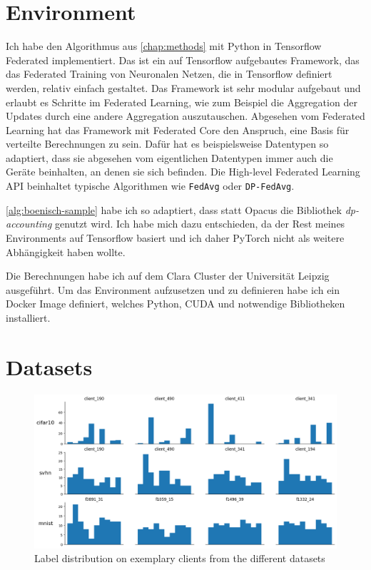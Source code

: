 \section{Environment}
Ich habe den Algorithmus aus \autoref{chap:methods} mit Python in Tensorflow Federated implementiert. Das ist ein auf Tensorflow aufgebautes Framework, das das Federated Training von Neuronalen Netzen, die in Tensorflow definiert werden, relativ einfach gestaltet. Das Framework ist sehr modular aufgebaut und erlaubt es Schritte im Federated Learning, wie zum Beispiel die Aggregation der Updates durch eine andere Aggregation auszutauschen. Abgesehen vom Federated Learning hat das Framework mit Federated Core den Anspruch, eine Basis für verteilte Berechnungen zu sein. Dafür hat es beispielsweise Datentypen so adaptiert, dass sie abgesehen vom eigentlichen Datentypen immer auch die Geräte beinhalten, an denen sie sich befinden. Die High-level Federated Learning API beinhaltet typische Algorithmen wie \texttt{FedAvg} oder \texttt{DP-FedAvg}.

\autoref{alg:boenisch-sample} habe ich so adaptiert, dass statt Opacus die Bibliothek \textit{dp-accounting} genutzt wird. Ich habe mich dazu entschieden, da der Rest meines Environments auf Tensorflow basiert und ich daher PyTorch nicht als weitere Abhängigkeit haben wollte.

Die Berechnungen habe ich auf dem Clara Cluster der Universität Leipzig ausgeführt. Um das Environment aufzusetzen und zu definieren habe ich ein Docker Image definiert, welches Python, CUDA und notwendige Bibliotheken installiert.

\section{Datasets}

\begin{figure}[tb]
	\centering
	\includegraphics[width=\textwidth]{Bilder/label_distribution.png}
	\caption{Label distribution on exemplary clients from the different datasets}
	\label{fig:label-distribution}
\end{figure}

